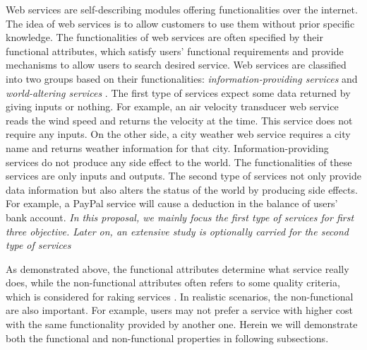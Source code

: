 Web services are self-describing modules offering functionalities over the internet. The idea of web services is to allow customers to use them without prior specific knowledge. The functionalities of web services are often specified by their functional attributes, which satisfy users' functional requirements and provide mechanisms to allow users to search desired service. Web services are classified into two groups based on their functionalities:  \emph{information-providing services} and \emph{world-altering services} \cite{mcilraith2001semantic}. The first type of services expect some data returned by giving inputs or nothing. For example, an air velocity transducer web service reads the wind speed and returns the velocity at the time. This service does not require any inputs. On the other side, a city weather web service requires a city name and returns weather information for that city. Information-providing services do not produce any side effect to the world. The functionalities of these services are only inputs and outputs. The second type of services not only provide data information but also alters the status of the world by producing side effects. For example, a PayPal service will cause a deduction in the balance of users' bank account. \emph{In this proposal, we mainly focus the first type of services for first three objective. Later on, an extensive study is optionally carried for the second type of services}

As demonstrated above, the functional attributes determine what service really does, while the non-functional attributes often refers to some quality criteria, which is considered for raking services \cite{agarwal2009making}. In realistic scenarios, the non-functional are also important. For example, users may not prefer a service with higher cost with the same functionality provided by another one. Herein we will demonstrate both the functional and non-functional properties in following subsections.




